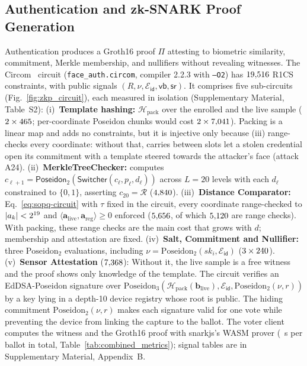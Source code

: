 \documentclass[10pt,letterpaper,journal]{IEEEtran}
\begin{document}
\subsection{Authentication and zk-SNARK Proof Generation}
Authentication produces a Groth16 proof $\Pi$ attesting to biometric similarity, commitment, Merkle membership, and nullifiers without revealing witnesses. The Circom~\cite{Circom2023} circuit (\texttt{face\_auth.circom}, compiler 2.2.3 with \texttt{--O2}) has $19{,}516$ R1CS constraints, with public signals $(R, \nu, \mathcal{E}_{\mathsf{id}}, \mathsf{vb}, \mathsf{sr})$. It comprises five sub-circuits (Fig.~\ref{fig:zkp_circuit}), each measured in isolation (Supplementary Material, Table~S2):
(i)~\textbf{Template hashing:} $\mathcal{H}_{\text{pack}}$ over the enrolled and the live sample ($2 \times 465$; per-coordinate Poseidon chunks would cost $2 \times 7{,}041$). Packing is a linear map and adds no constraints, but it is injective only because (iii) range-checks every coordinate: without that, carries between slots let a stolen credential open its commitment with a template steered towards the attacker's face (attack A24).
(ii)~\textbf{MerkleTreeChecker:} computes $c_{\ell+1} = \mathsf{Poseidon}_2(\mathsf{Switcher}(c_\ell, p_\ell, d_\ell))$ across $L=20$ levels with each $d_\ell$ constrained to $\{0,1\}$, asserting $c_{20} = \mathcal{R}$ ($4{,}840$).
(iii)~\textbf{Distance Comparator:} Eq.~\eqref{eq:sopq-circuit} with $\tau$ fixed in the circuit, every coordinate range-checked to $|a_k| < 2^{19}$ and $\langle \mathbf{a}_{\text{live}}, \mathbf{a}_{\text{reg}} \rangle \geq 0$ enforced ($5{,}656$, of which $5{,}120$ are range checks). With packing, these range checks are the main cost that grows with $d$; membership and attestation are fixed.
(iv)~\textbf{Salt, Commitment and Nullifier:} three $\text{Poseidon}_2$ evaluations, including $\nu = \text{Poseidon}_2(sk_i, \mathcal{E}_{\mathsf{id}})$ ($3 \times 240$).
(v)~\textbf{Sensor Attestation} ($7{,}368$): Without it, the live sample is a free witness and the proof shows only knowledge of the template. The circuit verifies an EdDSA-Poseidon signature over $\text{Poseidon}_3(\mathcal{H}_{\text{pack}}(\mathbf{b}_{\text{live}}), \mathcal{E}_{\mathsf{id}}, \text{Poseidon}_2(\nu, r))$ by a key lying in a depth-10 device registry whose root is public. The hiding commitment $\text{Poseidon}_2(\nu, r)$ makes each signature valid for one vote while preventing the device from linking the capture to the ballot.
The voter client computes the witness and the Groth16 proof with snarkjs's WASM prover (\nClientS~s per ballot in total, Table~\ref{tab:combined_metrics}); signal tables are in Supplementary Material, Appendix~B.
\end{document}
